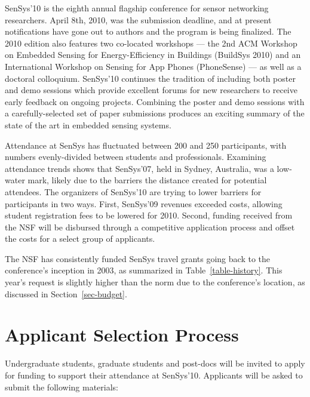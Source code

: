 SenSys'10 is the eighth annual flagship conference for sensor networking
researchers. April 8th, 2010, was the submission deadline, and at present
notifications have gone out to authors and the program is being finalized.
The 2010 edition also features two co-located workshops --- the 2nd ACM
Workshop on Embedded Sensing for Energy-Efficiency in Buildings (BuildSys
2010) and an International Workshop on Sensing for App Phones (PhoneSense)
--- as well as a doctoral colloquium. SenSys'10 continues the tradition of
including both poster and demo sessions which provide excellent forums for
new researchers to receive early feedback on ongoing projects. Combining the
poster and demo sessions with a carefully-selected set of paper submissions
produces an exciting summary of the state of the art in embedded sensing
systems.

Attendance at SenSys has fluctuated between 200 and 250 participants, with
numbers evenly-divided between students and professionals. Examining
attendance trends shows that SenSys'07, held in Sydney, Australia, was a
low-water mark, likely due to the barriers the distance created for potential
attendees. The organizers of SenSys'10 are trying to lower barriers for
participants in two ways. First, SenSys'09 revenues exceeded costs, allowing
student registration fees to be lowered for 2010. Second, funding received
from the NSF will be disbursed through a competitive application process and
offset the costs for a select group of applicants.

The NSF has consistently funded SenSys travel grants going back to the
conference's inception in 2003, as summarized in Table~\ref{table-history}.
This year's request is slightly higher than the norm due to the conference's
location, as discussed in Section~\ref{sec-budget}.

\section{Applicant Selection Process}

Undergraduate students, graduate students and post-docs will be invited to
apply for funding to support their attendance at SenSys'10.
Applicants will be asked to submit the following materials:

